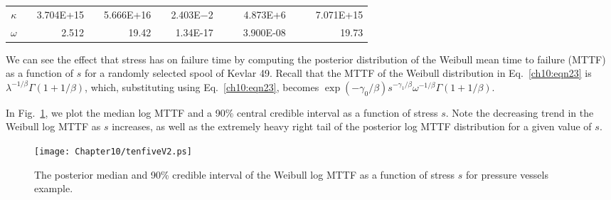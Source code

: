 \documentclass {book}
\begin{document}
\begin{table}
\begin{tabular}{crrrrrrrrrrrr}
    $\kappa$&\mbox{} &  3.704E+15 &\hspace{0.01in} &    5.666E+16 &\hspace{0.01in} &        2.403E$-$2 &\hspace{0.01in}  &\hspace{0.01in} &  4.873E+6 &\hspace{0.01in} &\hspace{0.01in} &    7.071E+15\\
$\omega$&\mbox{} & 2.512 &\hspace{0.01in} & 19.42 &\hspace{0.01in}
& 1.34E-17 &\hspace{0.01in}  &\hspace{0.01in} &
3.900E-08 &\hspace{0.01in} & \hspace{0.01in} & 19.73\\
 \hline
\end{tabular}
\end{table}

\iffalse Using $K=5$ bins, the value of the Bayesian $\chi^{2}$
goodness-of-fit test statistic discussed in Sect.~3.4 is computed
to be 4.1.  Comparing this to a $ChiSquared$(4) distribution, we
find that the p-value for testing whether the specified Weibull
regression model with random spool effects ``fits'' the data is
0.30.  Therefore, there is sufficient evidence to suggest that
this model provides an adequate fit to the data. \fi

We can see the effect that stress has on failure time by computing
the posterior distribution of the Weibull mean time to failure
(MTTF) as a function of $s$ for a randomly selected spool of
Kevlar 49. Recall that the MTTF of the Weibull distribution in
Eq.~\ref{ch10:eqn23} is $\lambda^{-1/\beta}\Gamma(1+1/\beta)$,
which, substituting using Eq.~\ref{ch10:eqn23}, becomes
$\exp(-\gamma_{0}/\beta)s^{-\gamma_{1}/\beta}\omega^{-1/\beta}\Gamma(1+1/\beta)$.

In Fig.~\ref{ch10:fig5}, we plot the median log MTTF and a 90\%
central credible interval as a function of stress $s$. Note the
decreasing trend in the Weibull log MTTF as $s$ increases, as well
as the extremely heavy right tail of the posterior log MTTF
distribution for a given value of $s$.

\begin{figure}
\centerline{\texttt{[image: Chapter10/tenfiveV2.ps]}}
\caption{The posterior median and 90\% credible interval of the Weibull log MTTF as a function of stress
$s$ for pressure vessels example.}\label{ch10:fig5}
\end{figure}
\end{document}
